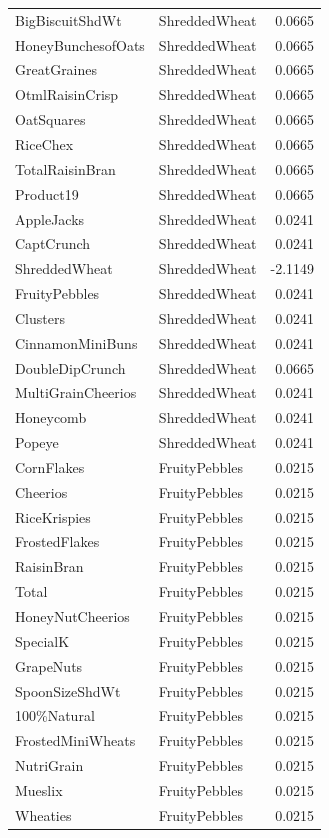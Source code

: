 \begin{longtable}{llr}
BigBiscuitShdWt & ShreddedWheat & 0.0665 \\
HoneyBunchesofOats & ShreddedWheat & 0.0665 \\
GreatGraines & ShreddedWheat & 0.0665 \\
OtmlRaisinCrisp & ShreddedWheat & 0.0665 \\
OatSquares & ShreddedWheat & 0.0665 \\
RiceChex & ShreddedWheat & 0.0665 \\
TotalRaisinBran & ShreddedWheat & 0.0665 \\
Product19 & ShreddedWheat & 0.0665 \\
AppleJacks & ShreddedWheat & 0.0241 \\
CaptCrunch & ShreddedWheat & 0.0241 \\
ShreddedWheat & ShreddedWheat & -2.1149 \\
FruityPebbles & ShreddedWheat & 0.0241 \\
Clusters & ShreddedWheat & 0.0241 \\
CinnamonMiniBuns & ShreddedWheat & 0.0241 \\
DoubleDipCrunch & ShreddedWheat & 0.0665 \\
MultiGrainCheerios & ShreddedWheat & 0.0241 \\
Honeycomb & ShreddedWheat & 0.0241 \\
Popeye & ShreddedWheat & 0.0241 \\
CornFlakes & FruityPebbles & 0.0215 \\
Cheerios & FruityPebbles & 0.0215 \\
RiceKrispies & FruityPebbles & 0.0215 \\
FrostedFlakes & FruityPebbles & 0.0215 \\
RaisinBran & FruityPebbles & 0.0215 \\
Total & FruityPebbles & 0.0215 \\
HoneyNutCheerios & FruityPebbles & 0.0215 \\
SpecialK & FruityPebbles & 0.0215 \\
GrapeNuts & FruityPebbles & 0.0215 \\
SpoonSizeShdWt & FruityPebbles & 0.0215 \\
100\%Natural & FruityPebbles & 0.0215 \\
FrostedMiniWheats & FruityPebbles & 0.0215 \\
NutriGrain & FruityPebbles & 0.0215 \\
Mueslix & FruityPebbles & 0.0215 \\
Wheaties & FruityPebbles & 0.0215 \\

\end{longtable}
